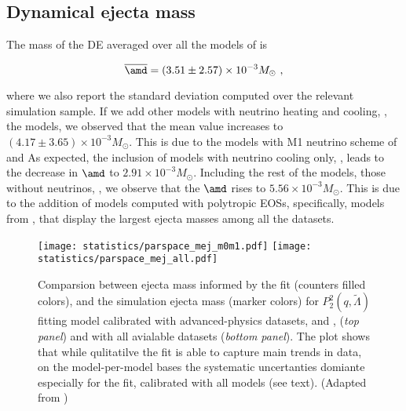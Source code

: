 
\subsection{Dynamical ejecta mass}

The mass of the \ac{DE} averaged over all the models of \DSrefset{} is 

\begin{equation}
\label{eq:ejecta:dyn:avg:M}
\overline{\amd} = (3.51 \pm 2.57)\times 10^{-3}M_{\odot}\ ,
\end{equation}

where we also report the standard deviation computed over the relevant simulation sample.
If we add other models with neutrino heating and cooling, \ie, the \DSheatcool{} models,
we observed that the mean value increases to $(4.17 \pm 3.65)\times 10^{-3}M_{\odot}$.
This is due to the models with M1 neutrino scheme of \citet{Vincent:2019kor} and \citet{Sekiguchi:2016bjd}
As expected, the inclusion of models with neutrino cooling only, \DScool{}, leads to the decrease in 
$\amd$ to $2.91\times 10^{-3}M_{\odot}$.
Including the rest of the models, those without neutrinos, \DSnone{}, we observe that the 
$\amd$ rises to $5.56\times 10^{-3}M_{\odot}$. This is due to the addition of models computed with
polytropic \acp{EOS}, specifically, models from \citet{Dietrich:2016hky}, that display 
the largest ejecta masses among all the datasets.

\begin{figure}[t]
    \centering 
    \texttt{[image: statistics/parspace\_mej\_m0m1.pdf]}
    \texttt{[image: statistics/parspace\_mej\_all.pdf]}
    \caption{
        Comparsion between ejecta mass informed by the fit (counters filled colors), 
        and the simulation ejecta mass (marker colors) for $P_2^2(q,\tilde{\Lambda})$ 
        fitting model calibrated with advanced-physics datasets, 
        \DSrefset{} and \DSheatcool{}, (\textit{top panel}) and with all 
        avialable datasets (\textit{bottom panel}).
        The plot shows that while qulitatilve the fit is able to capture main trends 
        in data, on the model-per-model bases the systematic uncertanties domiante 
        especially for the fit, calibrated with all models (see text).
        (Adapted from \citet{Nedora:2020qtd})
    }
    \label{fig:mej_parspace}
\end{figure}

